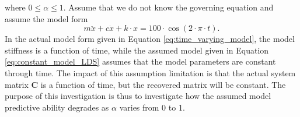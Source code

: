 \documentclass{article}
\begin{document}
where $0 \leq \alpha \leq 1$. Assume that we do not know the governing equation and assume the model form
\begin{equation}\label{eq:constant_model_LDS}
m \ddot{x} + c \dot{x} + k \cdot x = 100 \cdot \cos \left( 2 \cdot \pi \cdot t \right).
\end{equation}
In the actual model form given in Equation \eqref{eq:time_varying_model}, the model stiffness is a function of time, while the assumed model given in Equation \eqref{eq:constant_model_LDS} assumes that the model parameters are constant through time. The impact of this assumption limitation is that the actual system matrix $\mathbf{C}$ is a function of time, but the recovered matrix will be constant. The purpose of this investigation is thus to investigate how the assumed model predictive ability degrades as $\alpha$ varies from 0 to 1.
\end{document}
